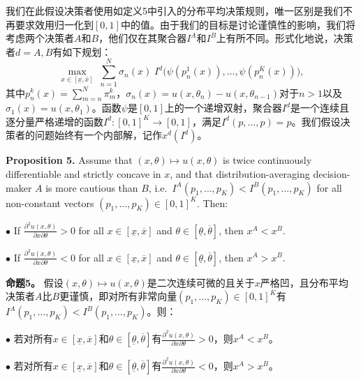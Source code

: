 \documentclass[12pt,a4paper]{article}
\newenvironment{original}
  {\par\noindent\ignorespaces}
  {\par}
\newenvironment{translation}
  {\par\noindent{\color{transblue}\ignorespaces}}
  {\par\medskip}
\begin{document}
\begin{translation}
我们在此假设决策者使用如定义5中引入的分布平均决策规则，唯一区别是我们不再要求效用归一化到$[0,1]$中的值。由于我们的目标是讨论谨慎性的影响，我们将考虑两个决策者$A$和$B$，他们仅在其聚合器$I^{A}$和$I^{B}$上有所不同。形式化地说，决策者$d = A, B$有如下规划：
\[
\max_{x \in [\underline{x}, \overline{x}]} \; \sum_{n=1}^{N} \sigma_{n}(x) \; I^{d}\!\big(\psi(p^{1}_{n}(x)), \dots, \psi(p^{K}_{n}(x))\big), \tag{9}
\]
其中$p^{k}_{n}(x) = \sum_{m=n}^{N} \pi^{k}_{m}$，$\sigma_{n}(x) = u(x, \theta_{n}) - u(x, \theta_{n-1})$对于$n > 1$以及$\sigma_{1}(x) = u(x, \theta_{1})$。函数$\psi$是$[0,1]$上的一个递增双射，聚合器$I^{d}$是一个连续且逐分量严格递增的函数$I^{d}: [0,1]^{K} \to [0,1]$，满足$I^{d}(p, \dots, p) = p$。我们假设决策者的问题始终有一个内部解，记作$x^{d}(I^{d})$。
\end{translation}

\begin{original}
\textbf{Proposition 5.} Assume that $(x, \theta) \mapsto u(x, \theta)$ is twice continuously differentiable and strictly concave in $x$, and that distribution-averaging decision-maker $A$ is more cautious than $B$, i.e.\ $I^{A}(p_{1}, \dots, p_{K}) < I^{B}(p_{1}, \dots, p_{K})$ for all non-constant vectors $(p_{1}, \dots, p_{K}) \in [0,1]^{K}$. Then:

$\bullet$ If $\frac{\partial^{2} u(x,\theta)}{\partial x \partial \theta} > 0$ for all $x \in [\underline{x}, \overline{x}]$ and $\theta \in [\underline{\theta}, \overline{\theta}]$, then $x^{A} < x^{B}$.

$\bullet$ If $\frac{\partial^{2} u(x,\theta)}{\partial x \partial \theta} < 0$ for all $x \in [\underline{x}, \overline{x}]$ and $\theta \in [\underline{\theta}, \overline{\theta}]$, then $x^{A} > x^{B}$.
\end{original}

\begin{translation}
\textbf{命题5。} 假设$(x, \theta) \mapsto u(x, \theta)$是二次连续可微的且关于$x$严格凹，且分布平均决策者$A$比$B$更谨慎，即对所有非常向量$(p_{1}, \dots, p_{K}) \in [0,1]^{K}$有$I^{A}(p_{1}, \dots, p_{K}) < I^{B}(p_{1}, \dots, p_{K})$。则：

$\bullet$ 若对所有$x \in [\underline{x}, \overline{x}]$和$\theta \in [\underline{\theta}, \overline{\theta}]$有$\frac{\partial^{2} u(x,\theta)}{\partial x \partial \theta} > 0$，则$x^{A} < x^{B}$。

$\bullet$ 若对所有$x \in [\underline{x}, \overline{x}]$和$\theta \in [\underline{\theta}, \overline{\theta}]$有$\frac{\partial^{2} u(x,\theta)}{\partial x \partial \theta} < 0$，则$x^{A} > x^{B}$。
\end{translation}
\end{document}
